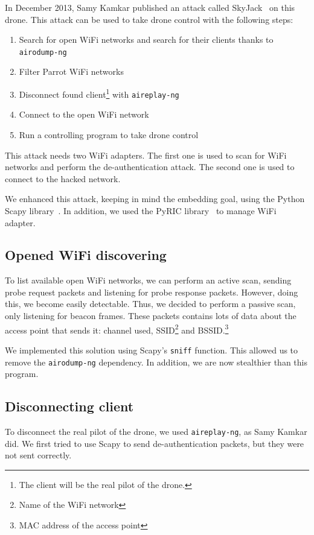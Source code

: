 \documentclass[conference,a4paper]{IEEEtran}
\newcommand{\myv}[1]{\texttt{\small#1}}
\begin{document}
In December 2013, Samy Kamkar published an attack called SkyJack~\cite{bib:skyjack} on
this drone. This attack can be used to take drone control with the following steps:

\begin{enumerate}
  \item Search for open WiFi networks and search for their clients thanks to
    \myv{airodump-ng}
  \item Filter Parrot WiFi networks
  \item Disconnect found client\footnote{The client will be the real pilot of the drone.}
    with \myv{aireplay-ng}
  \item Connect to the open WiFi network
  \item Run a controlling program to take drone control
\end{enumerate}

This attack needs two WiFi adapters. The first one is used to scan for WiFi networks and
perform the de-authentication attack. The second one is used to connect to the hacked
network.

We enhanced this attack, keeping in mind the embedding goal, using the Python Scapy
library~\cite{bib:scapy}. In addition, we used the PyRIC library~\cite{bib:pyric} to
manage WiFi adapter.

\subsection{Opened WiFi discovering}
To list available open WiFi networks, we can perform an active scan, sending probe
request packets and listening for probe response packets. However, doing this, we become
easily detectable. Thus, we decided to perform a passive scan, only listening for beacon
frames. These packets contains lots of data about the access point that sends it: channel
used, SSID\footnote{Name of the WiFi network} and BSSID.\footnote{MAC address of the access
point}

We implemented this solution using Scapy's \myv{sniff} function. This allowed us to
remove the \myv{airodump-ng} dependency. In addition, we are now stealthier than this
program.

\subsection{Disconnecting client}
To disconnect the real pilot of the drone, we used \myv{aireplay-ng}, as Samy Kamkar did.
We first tried to use Scapy to send de-authentication packets, but they were not sent
correctly.
\end{document}
